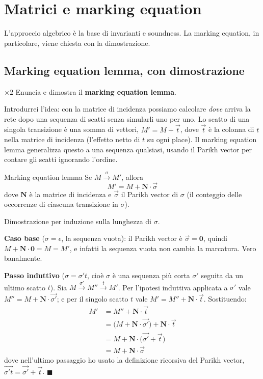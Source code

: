 \chapter{Matrici e marking equation}

L'approccio algebrico è la base di invarianti e soundness. La marking equation, in particolare, viene chiesta con la dimostrazione.

\section{Marking equation lemma, con dimostrazione}

\begin{domanda}{$\times 2$}
Enuncia e dimostra il \textbf{marking equation lemma}.
\end{domanda}

Introdurrei l'idea: con la matrice di incidenza possiamo calcolare \emph{dove} arriva la rete dopo una sequenza di scatti senza simularli uno per uno. Lo scatto di una singola transizione è una somma di vettori, $M' = M + \vec{t}$, dove $\vec{t}$ è la colonna di $t$ nella matrice di incidenza (l'effetto netto di $t$ su ogni place). Il marking equation lemma generalizza questo a una sequenza qualsiasi, usando il Parikh vector per contare gli scatti ignorando l'ordine.

\begin{teorema}{Marking equation lemma}
Se $M \xrightarrow{\sigma} M'$, allora
$$M' = M + \mathbf{N}\cdot\vec{\sigma}$$
dove $\mathbf{N}$ è la matrice di incidenza e $\vec{\sigma}$ il Parikh vector di $\sigma$ (il conteggio delle occorrenze di ciascuna transizione in $\sigma$).
\end{teorema}

Dimostrazione per induzione sulla lunghezza di $\sigma$.

\textbf{Caso base} ($\sigma = \epsilon$, la sequenza vuota): il Parikh vector è $\vec{\sigma} = \mathbf{0}$, quindi $M + \mathbf{N}\cdot\mathbf{0} = M = M'$, e infatti la sequenza vuota non cambia la marcatura. Vero banalmente.

\textbf{Passo induttivo} ($\sigma = \sigma' t$, cioè $\sigma$ è una sequenza più corta $\sigma'$ seguita da un ultimo scatto $t$). Sia $M \xrightarrow{\sigma'} M'' \xrightarrow{t} M'$. Per l'ipotesi induttiva applicata a $\sigma'$ vale $M'' = M + \mathbf{N}\cdot\vec{\sigma'}$; e per il singolo scatto $t$ vale $M' = M'' + \mathbf{N}\cdot\vec{t}$. Sostituendo:
$$
\begin{aligned}
M' &= M'' + \mathbf{N}\cdot\vec{t} \\
   &= \big(M + \mathbf{N}\cdot\vec{\sigma'}\big) + \mathbf{N}\cdot\vec{t} \\
   &= M + \mathbf{N}\cdot\big(\vec{\sigma'} + \vec{t}\big) \\
   &= M + \mathbf{N}\cdot\vec{\sigma}
\end{aligned}
$$
dove nell'ultimo passaggio ho usato la definizione ricorsiva del Parikh vector, $\overrightarrow{\sigma' t} = \vec{\sigma'} + \vec{t}$. $\blacksquare$

